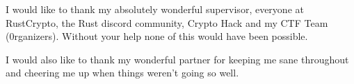 I would like to thank my absolutely wonderful supervisor, everyone at 
RustCrypto, the Rust discord community, Crypto Hack and my CTF Team (0rganizers).
Without your help none of this would have been possible.

I would also like to thank my wonderful partner for keeping me sane throughout and cheering me up when things weren't going so well.

